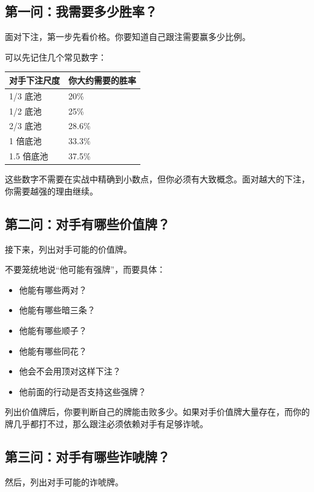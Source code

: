 \subsection{第一问：我需要多少胜率？}

面对下注，第一步先看价格。你要知道自己跟注需要赢多少比例。

可以先记住几个常见数字：

\begin{center}
\begin{tabular}{ll}
\toprule
\textbf{对手下注尺度} & \textbf{你大约需要的胜率} \\
\midrule
1/3 底池 & 20\% \\
1/2 底池 & 25\% \\
2/3 底池 & 28.6\% \\
1 倍底池 & 33.3\% \\
1.5 倍底池 & 37.5\% \\
\bottomrule
\end{tabular}
\end{center}

这些数字不需要在实战中精确到小数点，但你必须有大致概念。面对越大的下注，你需要越强的理由继续。

\subsection{第二问：对手有哪些价值牌？}

接下来，列出对手可能的价值牌。

不要笼统地说“他可能有强牌”，而要具体：

\begin{itemize}
\item 他能有哪些两对？
\item 他能有哪些暗三条？
\item 他能有哪些顺子？
\item 他能有哪些同花？
\item 他会不会用顶对这样下注？
\item 他前面的行动是否支持这些强牌？
\end{itemize}

列出价值牌后，你要判断自己的牌能击败多少。如果对手价值牌大量存在，而你的牌几乎都打不过，那么跟注必须依赖对手有足够诈唬。

\subsection{第三问：对手有哪些诈唬牌？}

然后，列出对手可能的诈唬牌。

